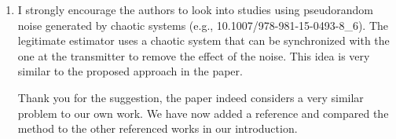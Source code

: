 \documentclass[a4paper]{scrartcl}
\newenvironment{rebuttal}{\begin{enumerate}[label={\color{grey}\thesection.\arabic{enumi}},leftmargin=0pt,ref=\thesection.\arabic{enumi}]}{\end{enumerate}}
\newcommand{\reviewtext}[1]{{\color{nblue} #1}}
\begin{document}
\begin{rebuttal}
\item \reviewtext{I strongly encourage the authors to look into studies using pseudorandom noise generated by chaotic systems (e.g., 10.1007/978-981-15-0493-8\_6). The legitimate estimator uses a chaotic system that can be synchronized with the one at the transmitter to remove the effect of the noise. This idea is very similar to the proposed approach in the paper.}

Thank you for the suggestion, the paper indeed considers a very similar problem to our own work. We have now added a reference and compared the method to the other referenced works in our introduction.

\end{rebuttal}

\end{document}
